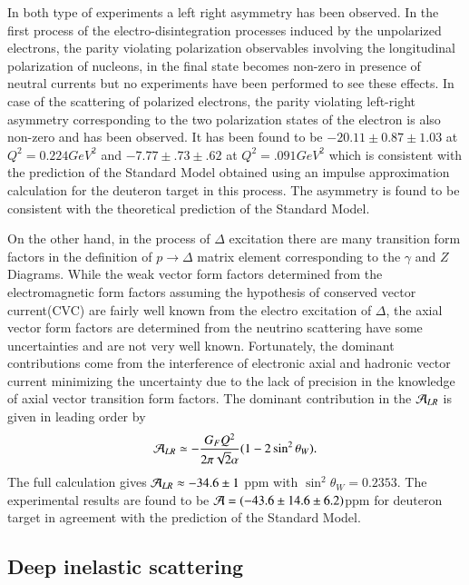 In both type of experiments a left right asymmetry has been observed. In the first process of the electro-disintegration  processes induced by the unpolarized electrons,  the parity violating polarization observables involving the longitudinal polarization of nucleons, in the final state becomes non-zero in presence of neutral currents but no experiments have been  performed to see these effects. In case of the scattering of polarized electrons, the parity violating left-right asymmetry corresponding to the two polarization states of the electron is also non-zero and has been observed. It has been found to be
$-20.11\pm0.87\pm1.03$ at $Q^2=0.224GeV^2$ \cite{chap9-key23} and $-7.77\pm.73\pm.62$ at $Q^2=.091 GeV^2$ \cite{chap9-key24} which is consistent with the prediction of the Standard Model obtained using an impulse approximation calculation for the deuteron target in this process. The asymmetry is found to be consistent with the theoretical prediction of the Standard Model. 

 On the other hand,  in the process of $\Delta$  excitation there are many transition form factors in the definition of  $p\rightarrow \Delta $ matrix element corresponding to the  $\gamma$ and $Z$ Diagrams. While the weak vector form factors determined from the electromagnetic form factors assuming the hypothesis of conserved vector current(CVC) are fairly well known from the electro excitation of $\Delta$,  the axial vector form factors are determined from the neutrino scattering have some uncertainties and are not very well known.  Fortunately,  the dominant contributions come from the interference of electronic axial and hadronic vector current  minimizing the uncertainty due to the lack of precision in the knowledge of axial vector transition form factors.  The dominant contribution in the ${\cal A}_{LR}$   is given in leading order by  
\begin{equation}
 {\cal A}_{LR}\simeq -\frac{G_F Q^2}{2\pi\sqrt{2}\alpha}(1-2\sin^2\theta_W). \label{chap9-eq27}
\end{equation}
 The full calculation gives ${\cal A}_{LR}\approx-34.6\pm 1$ ppm with $\sin^2\theta_W=0.2353$. The experimental results are found to be ${\cal A}= (-43.6\pm14.6\pm6.2)$ppm for deuteron target \cite{chap9-key25} in agreement with the prediction of the Standard Model.

\subsection{Deep inelastic scattering}\label{chap9-subsec3.3}

